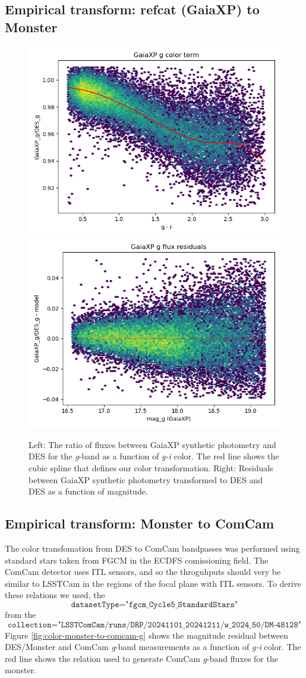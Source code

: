 \subsection{Empirical transform: refcat (GaiaXP) to Monster}
\label{sec:todes}
\begin{figure}
    \includegraphics[width=0.49\linewidth]{./figures/color_terms/GaiaXP_to_DES_band_g_color_term.png}
    \includegraphics[width=0.49\linewidth]{./figures/color_terms/GaiaXP_to_DES_band_g_flux_residuals.png}
    \caption{Left: The ratio of fluxes between GaiaXP synthetic photometry and DES for the \textit{g}-band as a function of \textit{g-i} color. The red line shows the cubic spline that defines our color transformation.
    Right: Residuals between GaiaXP synthetic photometry transformed to DES and DES as a function of magnitude.}
    \label{fig:color-xp-g}
\end{figure}


\subsection{Empirical transform: Monster to ComCam}
\label{sec:tocomcam}
The color transfomation from DES to ComCam bandpasses was performed using standard stars taken from FGCM in the ECDFS comissioning field. 
The ComCam detector uses ITL sensors, and so the throguhputs should very be similar to LSSTCam in the regions of the focal plane with ITL sensors. 
To derive these relations we used, the $$\texttt{datasetType="fgcm\_Cycle5\_StandardStars"}$$ from the $$\texttt{collection="LSSTComCam/runs/DRP/20241101\_20241211/w\_2024\_50/DM-48128"}$$
Figure \ref{fig:color-monster-to-comcam-g} shows the magnitude residual between DES/Monster and ComCam \textit{g}-band measurements as a function of \textit{g-i} color. 
The red line shows the relation used to generate ComCam \textit{g}-band fluxes for the monster. 


